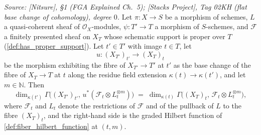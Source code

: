 \begin{lemma}
  \label{lem:gamma_fiber_baseChange_field}
  \textit{Source: [Nitsure], \S 1 (FGA Explained Ch.~5); [Stacks Project],
  Tag 02KH (flat base change of cohomology), degree \(0\).}
  Let \(\pi : X \to S\) be a morphism of schemes, \(L\) a quasi-coherent
  sheaf of \(\mathcal{O}_X\)-modules, \(\psi : T' \to T\) a morphism of
  \(S\)-schemes, and \(\mathcal{F}\) a finitely presented sheaf on \(X_T\)
  whose schematic support is proper over \(T\)
  (\cref{def:has_proper_support}).  Let \(t' \in T'\) with image
  \(t \in T\), let
  \[
    u : (X_{T'})_{t'} \longrightarrow (X_T)_t
  \]
  be the morphism exhibiting the fibre of \(X_{T'} \to T'\) at \(t'\) as the
  base change of the fibre of \(X_T \to T\) at \(t\) along the residue field
  extension \(\kappa(t) \to \kappa(t')\), and let \(m \in \mathbb{N}\).
  Then
  \[
    \dim_{\kappa(t')} \Gamma\bigl((X_{T'})_{t'},\,
      u^*(\mathcal{F}_t \otimes L_t^{\otimes m})\bigr)
    \;=\;
    \dim_{\kappa(t)} \Gamma\bigl((X_T)_t,\,
      \mathcal{F}_t \otimes L_t^{\otimes m}\bigr),
  \]
  where \(\mathcal{F}_t\) and \(L_t\) denote the restrictions of
  \(\mathcal{F}\) and of the pullback of \(L\) to the fibre \((X_T)_t\), and
  the right-hand side is the graded Hilbert function of
  \cref{def:fiber_hilbert_function} at \((t, m)\).
\end{lemma}
